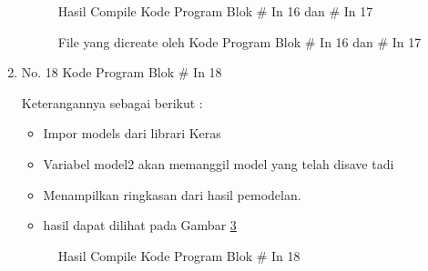 \begin{enumerate}
\begin{figure}[!htbp]
      \caption{Hasil Compile Kode Program Blok \# In 16 dan \# In 17}
      \label{refer27}
\end{figure}

\begin{figure}[!htbp]
      \caption{File yang dicreate oleh Kode Program Blok \# In 16 dan \# In 17}
      \label{refer28}
\end{figure}

\item No. 18 Kode Program Blok \# In 18
\par 
Keterangannya sebagai berikut :
\begin{itemize}
\item Impor models dari librari Keras
\item Variabel model2 akan memanggil model yang telah disave tadi 
\item Menampilkan ringkasan dari hasil pemodelan.
\item hasil dapat dilihat pada Gambar \ref{refer29}
\end{itemize}

\begin{figure}[!htbp]
      \caption{Hasil Compile Kode Program Blok \# In 18}
      \label{refer29}
\end{figure}


\end{enumerate}
